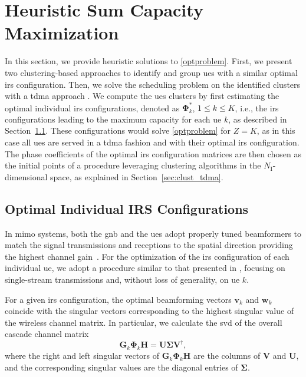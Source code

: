 \section{Heuristic Sum Capacity Maximization}
\label{sec:optimization}
In this section, we provide heuristic solutions to \eqref{optproblem}. First, we present two clustering-based approaches to identify and group \glspl{ue} with a similar optimal \gls{irs} configuration. Then, we solve the scheduling problem on the identified clusters with a \gls{tdma} approach \cite{anchora2012capacity}.
 We compute the \glspl{ue} clusters by first estimating the optimal {individual \gls{irs} configurations}, denoted as $\bm{\Phi}^*_k$, $1\leq k \leq K$, i.e., the \gls{irs} configurations leading to the maximum capacity for each \gls{ue} $k$, as described in Section~\ref{sec:ind_opt}.
 These configurations would solve \eqref{optproblem} for
$Z = K$, as in this case all \glspl{ue} are served in a \gls{tdma} fashion and with their optimal \gls{irs} configuration.
The phase coefficients of the optimal \gls{irs} configuration matrices are then chosen as the initial points of a procedure leveraging clustering algorithms in the $N_{\mathrm I}$-dimensional space, as explained in Section~\ref{sec:clust_tdma}.

\subsection{Optimal Individual IRS Configurations}
\label{sec:ind_opt}
In \gls{mimo} systems, both the \gls{gnb} and the \glspl{ue} adopt properly tuned beamformers to match the signal transmissions and receptions to the spatial direction providing the highest channel gain~\cite{flamini2022towards}. For the optimization of the \gls{irs} configuration of each individual \gls{ue}, we adopt a procedure similar to that presented in \cite{Qian22joint}, focusing on single-stream transmissions and, without loss of generality, on \gls{ue} $k$.


For a given \gls{irs} configuration, the optimal beamforming vectors $\bm{v}_k$ and $\bm{w}_k$ coincide with the singular vectors corresponding to the highest singular value of the wireless channel matrix. In particular, we calculate the \gls{svd} of the overall cascade channel matrix
\begin{equation}\label{eq:svd}
    \bm{G}_k \bm{\Phi}_k \bm{H} = \bm{U}\bm{\Sigma}\bm{V}^\dagger,
\end{equation}
where the right and left singular vectors of $\bm{G}_k \bm{\Phi}_k \bm{H}$ are the columns of $\bm{V}$ and $\bm{U}$, and the corresponding singular values are the diagonal entries of $\bm{\Sigma}$.


